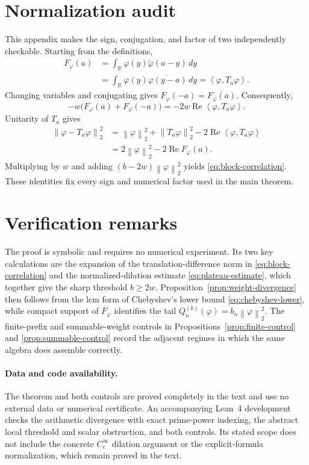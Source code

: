 \documentclass[11pt,a4paper]{amsart}
\newcommand{\R}{\mathbb{R}}
\newcommand{\ip}[2]{\left\langle #1,#2\right\rangle}
\newcommand{\norm}[1]{\left\lVert #1\right\rVert_{2}}
\theoremstyle{plain}
\theoremstyle{definition}
\begin{document}
\appendix

\section{Normalization audit}\label{app:normalization}

This appendix makes the sign, conjugation, and factor of two independently
checkable.  Starting from the definitions,
\begin{align*}
F_\varphi(a)
&=\int_{\R}\varphi(y)\widetilde\varphi(a-y)\,dy\\
&=\int_{\R}\varphi(y)\overline{\varphi(y-a)}\,dy
=\ip{\varphi}{T_a\varphi}.
\end{align*}
Changing variables and conjugating gives
$F_\varphi(-a)=\overline{F_\varphi(a)}$.  Consequently,
\[
 -w\bigl(F_\varphi(a)+F_\varphi(-a)\bigr)
 =-2w\operatorname{Re}\ip{\varphi}{T_a\varphi}.
\]
Unitarity of $T_a$ gives
\begin{align*}
\norm{\varphi-T_a\varphi}^{2}
&=\norm{\varphi}^{2}+\norm{T_a\varphi}^{2}
  -2\operatorname{Re}\ip{\varphi}{T_a\varphi}\\
&=2\norm{\varphi}^{2}
  -2\operatorname{Re}F_\varphi(a).
\end{align*}
Multiplying by $w$ and adding $(b-2w)\norm{\varphi}^{2}$ yields
\eqref{eq:block-correlation}.  These identities fix every sign and numerical
factor used in the main theorem.

\section{Verification remarks}\label{app:reproducibility}

The proof is symbolic and requires no numerical experiment.  Its two key
calculations are the expansion of the translation-difference norm in
\eqref{eq:block-correlation} and the normalized-dilation estimate
\eqref{eq:plateau-estimate}, which together give the sharp threshold
$b\geq2w$.  Proposition~\ref{prop:weight-divergence} then follows from
the lcm form of Chebyshev's lower bound \eqref{eq:chebyshev-lower}, while compact support
of $F_\varphi$ identifies the tail
$Q_n^{(b)}(\varphi)=b_n\norm{\varphi}^{2}$.  The finite-prefix and
summable-weight controls in Propositions~\ref{prop:finite-control} and
\ref{prop:summable-control} record the adjacent regimes in which the same
algebra does assemble correctly.

\paragraph{Data and code availability.}
The theorem and both controls are proved completely in the text and use no
external data or numerical certificate.  An accompanying Lean~4 development
checks the arithmetic divergence with exact prime-power indexing, the abstract
local threshold and scalar obstruction, and both controls.  Its stated scope
does not include the concrete $C_c^\infty$ dilation argument or the
explicit-formula normalization, which remain proved in the text.
\end{document}
